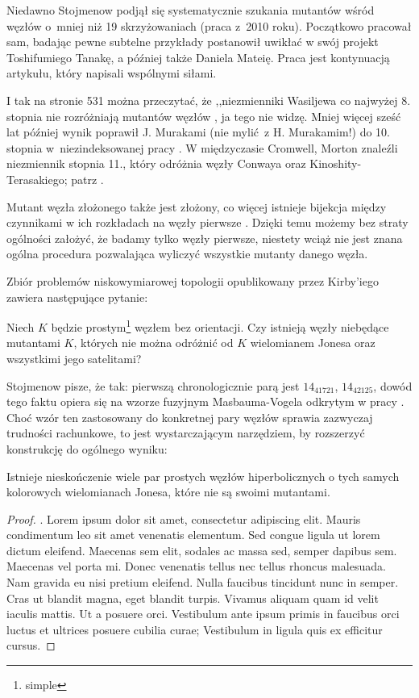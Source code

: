 Niedawno Stojmenow podjął się systematycznie szukania mutantów wśród węzłów o~mniej niż 19 skrzyżowaniach (praca \cite{stoimenow10} z~2010 roku).
Początkowo pracował sam, badając pewne subtelne przykłady postanowił uwikłać w swój projekt Toshifumiego Tanakę, a później także Daniela Mateię.
Praca \cite{stoimenow10} jest kontynuacją artykułu, który napisali wspólnymi siłami.

I tak na stronie 531 można przeczytać, że ,,niezmienniki Wasiljewa co najwyżej 8. stopnia nie rozróżniają mutantów węzłów \cite{chmutov94}, ja tego nie widzę.
Mniej więcej sześć lat później wynik poprawił J. Murakami (nie mylić z H. Murakamim!) do 10. stopnia w~niezindeksowanej pracy \cite{murakami99}.
W międzyczasie Cromwell, Morton znaleźli niezmiennik stopnia 11., który odróżnia węzły Conwaya oraz Kinoshity-Terasakiego; patrz \cite{cromwell96}.

Mutant węzła złożonego także jest złożony, co więcej istnieje bijekcja między czynnikami w ich rozkładach na węzły pierwsze \cite{ruberman87}.
Dzięki temu możemy bez straty ogólności założyć, że badamy tylko węzły pierwsze, niestety wciąż nie jest znana ogólna procedura pozwalająca wyliczyć wszystkie mutanty danego węzła.

Zbiór problemów niskowymiarowej topologii opublikowany przez Kirby'iego \cite{kirby78} zawiera następujące pytanie:
\begin{conjecture}[problem 1.91]
    Niech $K$ będzie prostym\footnote{simple} węzłem bez orientacji.
    Czy istnieją węzły niebędące mutantami $K$, których nie można odróżnić od $K$ wielomianem Jonesa oraz wszystkimi jego satelitami?
\end{conjecture}

Stojmenow pisze, że tak: pierwszą chronologicznie parą jest $14_{41721}$, $14_{42125}$, dowód tego faktu opiera się na wzorze fuzyjnym Masbauma-Vogela odkrytym w pracy \cite{masbaum94}.
Choć wzór ten zastosowany do konkretnej pary węzłów sprawia zazwyczaj trudności rachunkowe, to jest wystarczającym narzędziem, by rozszerzyć konstrukcję do ogólnego wyniku:

\begin{proposition}
    Istnieje nieskończenie wiele par prostych węzłów hiperbolicznych o tych samych kolorowych wielomianach Jonesa, które nie są swoimi mutantami.
\end{proposition}

\begin{proof}
    \cite{tanaka09}.
    Lorem ipsum dolor sit amet, consectetur adipiscing elit.
    Mauris condimentum leo sit amet venenatis elementum.
    Sed congue ligula ut lorem dictum eleifend.
    Maecenas sem elit, sodales ac massa sed, semper dapibus sem.
    Maecenas vel porta mi.
    Donec venenatis tellus nec tellus rhoncus malesuada.
    Nam gravida eu nisi pretium eleifend.
    Nulla faucibus tincidunt nunc in semper.
    Cras ut blandit magna, eget blandit turpis.
    Vivamus aliquam quam id velit iaculis mattis.
    Ut a posuere orci.
    Vestibulum ante ipsum primis in faucibus orci luctus et ultrices posuere cubilia curae; Vestibulum in ligula quis ex efficitur cursus.
\end{proof}

